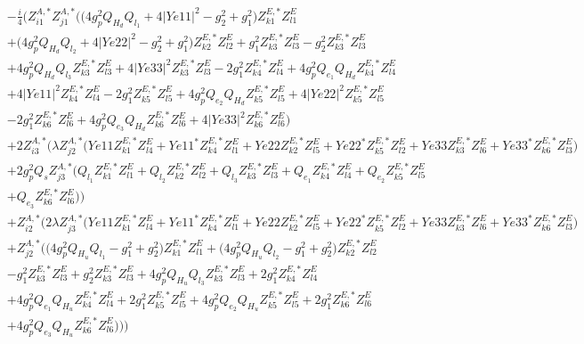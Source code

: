 \begin{align} 
 &-\frac{i}{4} \Big(Z^{A,*}_{i 1} Z^{A,*}_{j 1} \Big(\Big(4 g_{p}^{2} Q_{H_d} Q_{l_1}  + 4 |Ye11|^2  - g_{2}^{2}  + g_{1}^{2}\Big)Z^{E,*}_{k 1} Z_{{l 1}}^{E} \nonumber \\ 
 &+\Big(4 g_{p}^{2} Q_{H_d} Q_{l_2}  + 4 |Ye22|^2  - g_{2}^{2}  + g_{1}^{2}\Big)Z^{E,*}_{k 2} Z_{{l 2}}^{E} +g_{1}^{2} Z^{E,*}_{k 3} Z_{{l 3}}^{E} - g_{2}^{2} Z^{E,*}_{k 3} Z_{{l 3}}^{E} \nonumber \\ 
 &+4 g_{p}^{2} Q_{H_d} Q_{l_3} Z^{E,*}_{k 3} Z_{{l 3}}^{E} +4 |Ye33|^2 Z^{E,*}_{k 3} Z_{{l 3}}^{E} -2 g_{1}^{2} Z^{E,*}_{k 4} Z_{{l 4}}^{E} +4 g_{p}^{2} Q_{e_{1}} Q_{H_d} Z^{E,*}_{k 4} Z_{{l 4}}^{E} \nonumber \\ 
 &+4 |Ye11|^2 Z^{E,*}_{k 4} Z_{{l 4}}^{E} -2 g_{1}^{2} Z^{E,*}_{k 5} Z_{{l 5}}^{E} +4 g_{p}^{2} Q_{e_{2}} Q_{H_d} Z^{E,*}_{k 5} Z_{{l 5}}^{E} +4 |Ye22|^2 Z^{E,*}_{k 5} Z_{{l 5}}^{E} \nonumber \\ 
 &-2 g_{1}^{2} Z^{E,*}_{k 6} Z_{{l 6}}^{E} +4 g_{p}^{2} Q_{e_3} Q_{H_d} Z^{E,*}_{k 6} Z_{{l 6}}^{E} +4 |Ye33|^2 Z^{E,*}_{k 6} Z_{{l 6}}^{E} \Big)\nonumber \\ 
 &+2 Z^{A,*}_{i 3} \Big(\lambda Z^{A,*}_{j 2} \Big(Ye11 Z^{E,*}_{k 1} Z_{{l 4}}^{E}  + Ye11^* Z^{E,*}_{k 4} Z_{{l 1}}^{E}  + Ye22 Z^{E,*}_{k 2} Z_{{l 5}}^{E}  + Ye22^* Z^{E,*}_{k 5} Z_{{l 2}}^{E}  + Ye33 Z^{E,*}_{k 3} Z_{{l 6}}^{E}  + Ye33^* Z^{E,*}_{k 6} Z_{{l 3}}^{E} \Big)\nonumber \\ 
 &+2 g_{p}^{2} Q_s Z^{A,*}_{j 3} \Big(Q_{l_1} Z^{E,*}_{k 1} Z_{{l 1}}^{E} +Q_{l_2} Z^{E,*}_{k 2} Z_{{l 2}}^{E} +Q_{l_3} Z^{E,*}_{k 3} Z_{{l 3}}^{E} +Q_{e_{1}} Z^{E,*}_{k 4} Z_{{l 4}}^{E} +Q_{e_{2}} Z^{E,*}_{k 5} Z_{{l 5}}^{E} \nonumber \\ 
 &+Q_{e_3} Z^{E,*}_{k 6} Z_{{l 6}}^{E} \Big)\Big)\nonumber \\ 
 &+Z^{A,*}_{i 2} \Big(2 \lambda Z^{A,*}_{j 3} \Big(Ye11 Z^{E,*}_{k 1} Z_{{l 4}}^{E}  + Ye11^* Z^{E,*}_{k 4} Z_{{l 1}}^{E}  + Ye22 Z^{E,*}_{k 2} Z_{{l 5}}^{E}  + Ye22^* Z^{E,*}_{k 5} Z_{{l 2}}^{E}  + Ye33 Z^{E,*}_{k 3} Z_{{l 6}}^{E}  + Ye33^* Z^{E,*}_{k 6} Z_{{l 3}}^{E} \Big)\nonumber \\ 
 &+Z^{A,*}_{j 2} \Big(\Big(4 g_{p}^{2} Q_{H_u} Q_{l_1}  - g_{1}^{2}  + g_{2}^{2}\Big)Z^{E,*}_{k 1} Z_{{l 1}}^{E} +\Big(4 g_{p}^{2} Q_{H_u} Q_{l_2}  - g_{1}^{2}  + g_{2}^{2}\Big)Z^{E,*}_{k 2} Z_{{l 2}}^{E} \nonumber \\ 
 &- g_{1}^{2} Z^{E,*}_{k 3} Z_{{l 3}}^{E} +g_{2}^{2} Z^{E,*}_{k 3} Z_{{l 3}}^{E} +4 g_{p}^{2} Q_{H_u} Q_{l_3} Z^{E,*}_{k 3} Z_{{l 3}}^{E} +2 g_{1}^{2} Z^{E,*}_{k 4} Z_{{l 4}}^{E} \nonumber \\ 
 &+4 g_{p}^{2} Q_{e_{1}} Q_{H_u} Z^{E,*}_{k 4} Z_{{l 4}}^{E} +2 g_{1}^{2} Z^{E,*}_{k 5} Z_{{l 5}}^{E} +4 g_{p}^{2} Q_{e_{2}} Q_{H_u} Z^{E,*}_{k 5} Z_{{l 5}}^{E} +2 g_{1}^{2} Z^{E,*}_{k 6} Z_{{l 6}}^{E} \nonumber \\ 
 &+4 g_{p}^{2} Q_{e_3} Q_{H_u} Z^{E,*}_{k 6} Z_{{l 6}}^{E} \Big)\Big)\Big)\end{align} 
